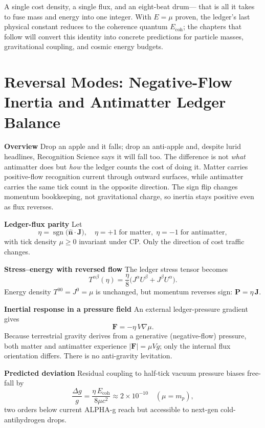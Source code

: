 \documentclass[11pt,oneside]{book}
\begin{document}
A single cost density, a single flux, and an eight-beat drum—
that is all it takes to fuse mass and energy into one integer.
With \(E=\mu\) proven, the ledger’s last physical constant
reduces to the coherence quantum \(E_{\text{coh}}\);
the chapters that follow will convert this identity into concrete
predictions for particle masses, gravitational coupling,
and cosmic energy budgets.

\bigskip

\section{Reversal Modes: Negative-Flow Inertia and Antimatter Ledger Balance}
\label{sec:negative-flow}

\textbf{Overview}  
Drop an apple and it falls; drop an anti-apple and, despite lurid headlines, Recognition Science says it will fall too.  The difference is not \emph{what} antimatter does but \emph{how} the ledger counts the cost of doing it.  Matter carries positive-flow recognition current through outward surfaces, while antimatter carries the same tick count in the opposite direction.  The sign flip changes momentum bookkeeping, not gravitational charge, so inertia stays positive even as flux reverses.

\textbf{Ledger-flux parity}  
Let  
\[
\eta=\operatorname{sgn}\bigl(\hat{\mathbf n}\!\cdot\!\mathbf J\bigr),
\quad
\eta=+1\;\text{for matter},\;
\eta=-1\;\text{for antimatter},
\]
with tick density \(\mu\ge0\) invariant under CP.  Only the direction of cost traffic changes.

\textbf{Stress–energy with reversed flow}  
The ledger stress tensor becomes  
\[
T^{\alpha\beta}(\eta)=\frac{\eta}{8}\bigl(J^{\alpha}U^{\beta}+J^{\beta}U^{\alpha}\bigr).
\]  
Energy density \(T^{00}=J^{0}=\mu\) is unchanged, but momentum reverses sign: \(\mathbf P=\eta\,\mathbf J\).

\textbf{Inertial response in a pressure field}  
An external ledger-pressure gradient gives  
\[
\mathbf F=-\eta\,V\nabla\mu .
\]  
Because terrestrial gravity derives from a generative (negative-flow) pressure, both matter and antimatter experience \(|\mathbf F|=\mu V g\); only the internal flux orientation differs.  There is no anti-gravity levitation.

\textbf{Predicted deviation}  
Residual coupling to half-tick vacuum pressure biases free-fall by  
\[
\frac{\Delta g}{g}= \frac{\eta\,E_{\text{coh}}}{8\mu c^{2}}
                 \approx 2\times10^{-10}\quad(\mu=m_{p}),
\]  
two orders below current ALPHA-g reach but accessible to next-gen cold-antihydrogen drops.
\end{document}
